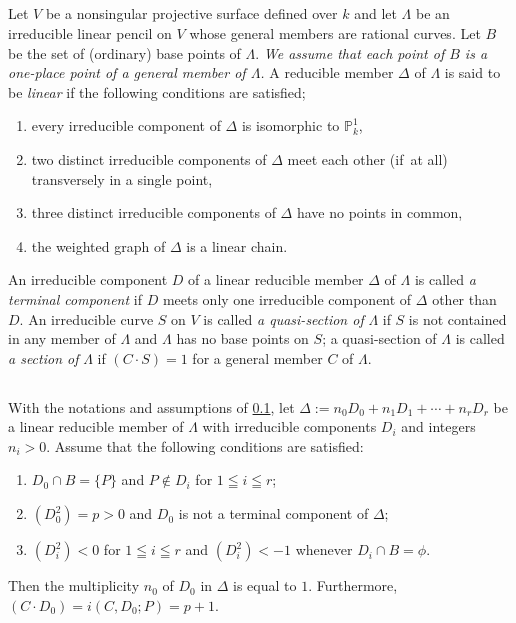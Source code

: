 \subsection{}\label{chap2:6.2}
Let $V$ be a nonsingular projective surface defined over $k$ and let
$\Lambda$ be an irreducible linear pencil on $V$ whose general members
are rational curves. Let $B$ be the set of (ordinary) base points of
$\Lambda$. {\em We assume that each point of $B$ is a one-place point
  of a general member of $\Lambda$.} A reducible member $\Delta$ of
$\Lambda$ is said to be {\em linear} if the following conditions are
satisfied;
\begin{enumerate}
\renewcommand{\theenumi}{\roman{enumi}}
\renewcommand{\labelenumi}{(\theenumi)}
\item every irreducible component of $\Delta$ is isomorphic to
  $\mathbb{P}^{1}_{k}$, 

\item two distinct irreducible components of $\Delta$ meet each other
  (if\pageoriginale\ at all) transversely in a single point,

\item three distinct irreducible components of $\Delta$ have no points
  in common,

\item the weighted graph of $\Delta$ is a linear chain.
\end{enumerate}
An irreducible component $D$ of a linear reducible member $\Delta$ of
$\Lambda$ is called {\em a terminal component} if $D$ meets only one
irreducible component of $\Delta$ other than $D$. An irreducible curve
$S$ on $V$ is called {\em a quasi-section of } $\Lambda$ if $S$ is not
contained in any member of $\Lambda$ and $\Lambda$ has no base points
on $S$; a quasi-section of $\Lambda$ is called {\em a section of}
$\Lambda$ if $(C\cdot S)=1$ for a general member $C$ of $\Lambda$.


\subsection{}\label{chap2:6.3}
\begin{lemma*}
  With the notations and assumptions of \ref{chap2:6.2}, let
  $\Delta:=n_{0}D_{0}+n_{1}D_{1}+\cdots+n_{r}D_{r}$ be a linear
  reducible member of $\Lambda$ with irreducible components $D_{i}$ and
  integers $n_{i}>0$. Assume that the following conditions are
  satisfied:
  \begin{enumerate}
    \renewcommand{\labelenumi}{\rm(\theenumi)}
  \item $D_{0}\cap B=\{P\}$ and $P\not\in D_{i}$ for $1\leqq i\leqq r$;
    
  \item $(D^{2}_{0})=p>0$ and $D_{0}$ is not a terminal component of
    $\Delta$;
    
  \item $(D^{2}_{i})<0$ for $1\leqq i\leqq r$ and $(D^{2}_{i})<-1$
    whenever $D_{i}\cap B=\phi$.
  \end{enumerate}
  Then the multiplicity $n_{0}$ of $D_{0}$ in $\Delta$ is equal to
  $1$. Furthermore, $(C\cdot D_{0})=i(C,D_{0};P)=p+1$.
\end{lemma*}

